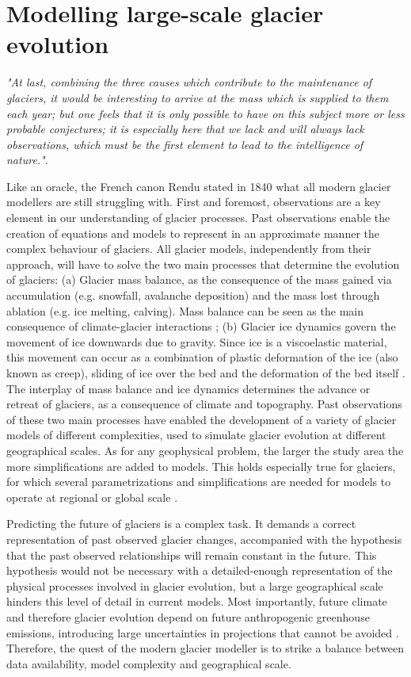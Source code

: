 \section{Modelling large-scale glacier evolution}

\emph{"At last, combining the three causes which contribute to the maintenance of glaciers, it would be interesting to arrive at the mass which is supplied to them each year; but one feels that it is only possible to have on this subject more or less probable conjectures; it is especially here that we lack and will always lack observations, which must be the first element to lead to the intelligence of nature."}.

Like an oracle, the French canon Rendu stated in 1840 what all modern glacier modellers are still struggling with. First and foremost, observations are a key element in our understanding of glacier processes. Past observations enable the creation of equations and models to represent in an approximate manner the complex behaviour of glaciers. All glacier models, independently from their approach, will have to solve the two main processes that determine the evolution of glaciers: (a) Glacier mass balance, as the consequence of the mass gained via accumulation (e.g. snowfall, avalanche deposition) and the mass lost through ablation (e.g. ice melting, calving). Mass balance can be seen as the main consequence of climate-glacier interactions \citep{benn_glaciers_2014}; (b) Glacier ice dynamics govern the movement of ice downwards due to gravity. Since ice is a viscoelastic material, this movement can occur as a combination of plastic deformation of the ice (also known as creep), sliding of ice over the bed and the deformation of the bed itself \citep{cuffey_physics_2010}. The interplay of mass balance and ice dynamics determines the advance or retreat of glaciers, as a consequence of climate and topography. Past observations of these two main processes have enabled the development of a variety of glacier models of different complexities, used to simulate glacier evolution at different geographical scales. As for any geophysical problem, the larger the study area the more simplifications are added to models. This holds especially true for glaciers, for which several parametrizations and simplifications are needed for models to operate at regional or global scale \citep[e.g.][]{marzeion_past_2012, huss_new_2015, maussion_open_2019}. 

Predicting the future of glaciers is a complex task. It demands a correct representation of past observed glacier changes, accompanied with the hypothesis that the past observed relationships will remain constant in the future. This hypothesis would not be necessary with a detailed-enough representation of the physical processes involved in glacier evolution, but a large geographical scale hinders this level of detail in current models. Most importantly, future climate and therefore glacier evolution depend on future anthropogenic greenhouse emissions, introducing large uncertainties in projections that cannot be avoided \citep{marzeion_partitioning_2020}. Therefore, the quest of the modern glacier modeller is to strike a balance between data availability, model complexity and geographical scale.

